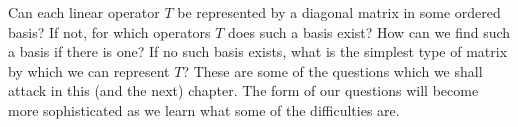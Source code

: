 Can each linear operator \(T\) be represented by a diagonal matrix in some ordered basis? If not, for which operators \(T\) does such a basis exist? How can we find such a basis if there is one? If no such basis exists, what is the simplest type of matrix by which we can represent \(T\)? These are some of the questions which we shall attack in this (and the next) chapter. The form of our questions will become more sophisticated as we learn what some of the difficulties are.
